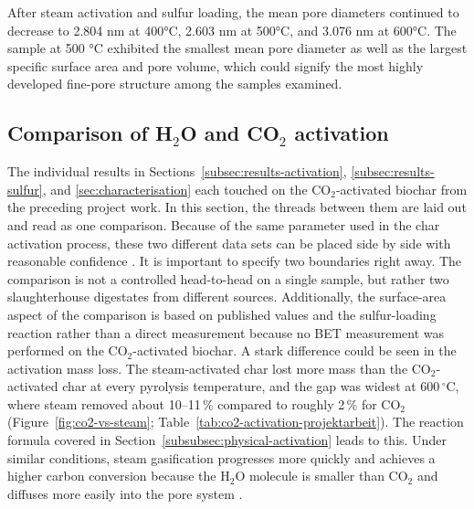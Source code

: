 \vspace{0.3em}

After steam activation and sulfur loading, the mean pore diameters continued to decrease to 2.804 nm at 400°C, 2.603 nm at 500°C, and 3.076 nm at 600°C. The sample at 500 °C exhibited the smallest mean pore diameter as well as the largest specific surface area and pore volume, which could signify the most highly developed fine-pore structure among the samples examined. 

\newpage
\subsection{Comparison of H\texorpdfstring{$_2$}{2}O and CO\texorpdfstring{$_2$}{2} activation}
\label{subsec:h2o-vs-co2}

The individual results in Sections~\ref{subsec:results-activation}, \ref{subsec:results-sulfur}, and \ref{sec:characterisation} each touched on the CO$_2$-activated biochar from the preceding project work. In this section, the threads between them are laid out and read as one comparison. Because of the same parameter used in the char activation process, these two different data sets can be placed side by side with reasonable confidence \cite{MartinezHuete2024Projektarbeit}. It is important to specify two boundaries right away. The comparison is not a controlled head-to-head on a single sample, but rather two slaughterhouse digestates from different sources. Additionally, the surface-area aspect of the comparison is based on published values and the sulfur-loading reaction rather than a direct measurement because no BET measurement was performed on the CO$_2$-activated biochar. A stark difference could be seen in the activation mass loss. The steam-activated char lost more mass than the CO$_2$-activated char at every pyrolysis temperature, and the gap was widest at 600\,$^{\circ}$C, where steam removed about 10--11\,\% compared to roughly 2\,\% for CO$_2$ (Figure~\ref{fig:co2-vs-steam}; Table~\ref{tab:co2-activation-projektarbeit}). The reaction formula covered in Section~\ref{subsubsec:physical-activation} leads to this. Under similar conditions, steam gasification progresses more quickly and achieves a higher carbon conversion because the H$_2$O molecule is smaller than CO$_2$ and diffuses more easily into the pore system \cite{Sajjadi2019, Zhang2021TyreActivation}. 

\vspace{0.3em}

